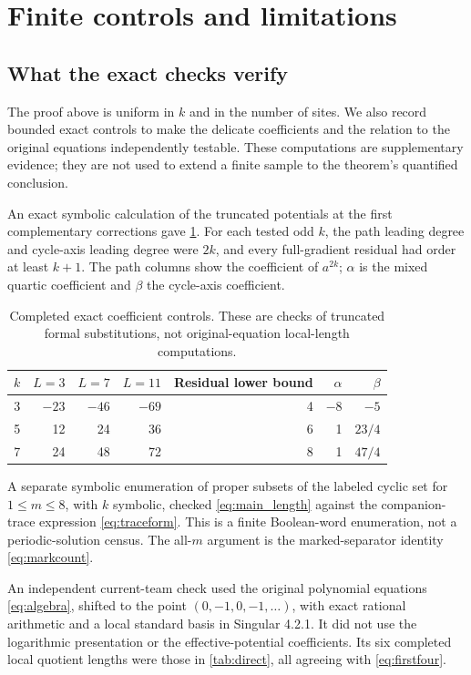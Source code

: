 \section{Finite controls and limitations}\label{sec:limits}

\subsection{What the exact checks verify}

The proof above is uniform in $k$ and in the number of sites. We also
record bounded exact controls to make the delicate coefficients and the
relation to the original equations independently testable. These
computations are supplementary evidence; they are not used to extend a
finite sample to the theorem's quantified conclusion.

An exact symbolic calculation of the truncated potentials at the first
complementary corrections gave \cref{tab:coefficients}. For each tested
odd $k$, the path leading degree and cycle-axis leading degree were $2k$,
and every full-gradient residual had order at least $k+1$.
The path columns show the coefficient of $a^{2k}$; $\alpha$ is the mixed
quartic coefficient and $\beta$ the cycle-axis coefficient.

\begin{table}[htbp]
\centering
\caption{Completed exact coefficient controls. These are checks of
truncated formal substitutions, not original-equation local-length
computations.}\label{tab:coefficients}
\begin{tabular}{rrrrrrr}
\toprule
$k$ & $L=3$ & $L=7$ & $L=11$ & Residual lower bound & $\alpha$ & $\beta$\\
\midrule
3 & $-23$ & $-46$ & $-69$ & 4 & $-8$ & $-5$\\
5 & 12 & 24 & 36 & 6 & 1 & $23/4$\\
7 & 24 & 48 & 72 & 8 & 1 & $47/4$\\
\bottomrule
\end{tabular}
\end{table}

A separate symbolic enumeration of proper subsets of the labeled cyclic
set for $1\leq m\leq8$, with $k$ symbolic, checked
\eqref{eq:main_length} against the companion-trace expression
\eqref{eq:traceform}. This is a finite Boolean-word enumeration, not a
periodic-solution census. The all-$m$ argument is the marked-separator
identity \eqref{eq:markcount}.

An independent current-team check used the original polynomial equations
\eqref{eq:algebra}, shifted to the point $(0,-1,0,-1,\ldots)$, with
exact rational arithmetic and a local standard basis in Singular 4.2.1.
It did not use the logarithmic presentation or the effective-potential
coefficients. Its six completed local quotient lengths were those in
\cref{tab:direct}, all agreeing with \eqref{eq:firstfour}.

